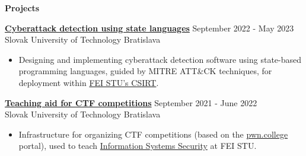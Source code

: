 \documentclass[12pt]{article}
\begin{document}




\vspace{0.12in} %

\begin{center}
	{\noindent \bfseries Projects}
\end{center}

\vspace{0.12pt}

\noindent
{\bfseries \href{https://opac.crzp.sk/?fn=detailBiblioFormChildU1JSMF&sid=C0DEB8E07572332BAD240C15805F&seo=CRZP-detail-kniha}{Cyberattack detection using state languages} } \hfill September 2022 - May 2023 \\[0.04in]
\noindent Slovak University of Technology \hfill Bratislava 
\begin{itemize} \itemsep -2pt %
	\item Designing and implementing cyberattack detection software using state-based programming languages, guided by MITRE ATT\&CK techniques, for deployment within \href{https://csirt.fei.stuba.sk}{FEI STU's CSIRT}.
\end{itemize}

\vspace{0.12in}

\noindent
{\bfseries \href{https://feictf.xyz/}{Teaching aid for CTF competitions} } \hfill September 2021 - June 2022 \\[0.04in]
\noindent Slovak University of Technology \hfill Bratislava 
\begin{itemize} \itemsep -2pt %
	\item Infrastructure for organizing CTF competitions (based on the \href{https://pwn.college/}{pwn.college} portal), used to teach \href{https://uim.fei.stuba.sk/predmet/i-bispp/}{Information Systems Security} at FEI STU.
\end{itemize}

\vspace{0.12in}
\end{document}
